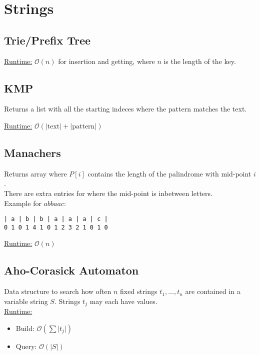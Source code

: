 \section{Strings}
\subsection{Trie/Prefix Tree}
\underline{Runtime:} $\mathcal{O}(n)$ for insertion and getting, where
$n$ is the length of the key.

\subsection{KMP}
Returns a list with all the starting indeces where the pattern matches
the text.

\underline{Runtime:} $\mathcal{O}(\left| \text{text} \right| + \left|
  \text{pattern} \right|)$

\subsection{Manachers}
Returns array where $P[i]$ contains the length of the palindrome with mid-point $i$.\\
There are extra entries for where the mid-point is inbetween letters.\\
Example for $abbaac$:
\begin{lstlisting}
| a | b | b | a | a | a | c |
0 1 0 1 4 1 0 1 2 3 2 1 0 1 0
\end{lstlisting}
\underline{Runtime:} $\mathcal{O}(n)$
\subsection{Aho-Corasick Automaton}
Data structure to search how often $n$ fixed strings $t_1, \dots, t_n$ are contained in a variable string $S$. Strings $t_j$ may each have values.\\
\underline{Runtime:}
\begin{itemize}
	\item Build: $\mathcal{O}(\sum \lvert t_j \rvert)$
	\item Query: $\mathcal{O}(\lvert S \rvert)$
\end{itemize}

